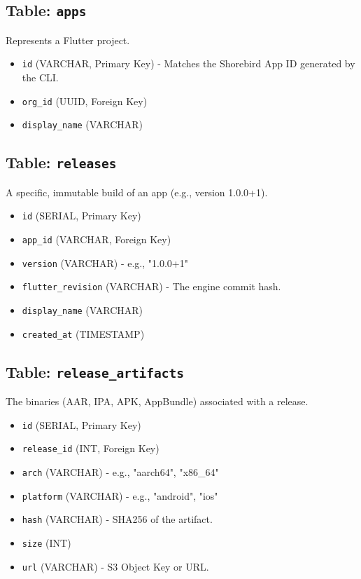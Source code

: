 \documentclass[12pt,a4paper]{article}
\begin{document}
\subsection{Table: \texttt{apps}}
Represents a Flutter project.
\begin{itemize}
    \item \texttt{id} (VARCHAR, Primary Key) - Matches the Shorebird App ID generated by the CLI.
    \item \texttt{org\_id} (UUID, Foreign Key)
    \item \texttt{display\_name} (VARCHAR)
\end{itemize}

\subsection{Table: \texttt{releases}}
A specific, immutable build of an app (e.g., version 1.0.0+1).
\begin{itemize}
    \item \texttt{id} (SERIAL, Primary Key)
    \item \texttt{app\_id} (VARCHAR, Foreign Key)
    \item \texttt{version} (VARCHAR) - e.g., "1.0.0+1"
    \item \texttt{flutter\_revision} (VARCHAR) - The engine commit hash.
    \item \texttt{display\_name} (VARCHAR)
    \item \texttt{created\_at} (TIMESTAMP)
\end{itemize}

\subsection{Table: \texttt{release\_artifacts}}
The binaries (AAR, IPA, APK, AppBundle) associated with a release.
\begin{itemize}
    \item \texttt{id} (SERIAL, Primary Key)
    \item \texttt{release\_id} (INT, Foreign Key)
    \item \texttt{arch} (VARCHAR) - e.g., "aarch64", "x86\_64"
    \item \texttt{platform} (VARCHAR) - e.g., "android", "ios"
    \item \texttt{hash} (VARCHAR) - SHA256 of the artifact.
    \item \texttt{size} (INT)
    \item \texttt{url} (VARCHAR) - S3 Object Key or URL.
\end{itemize}
\end{document}
